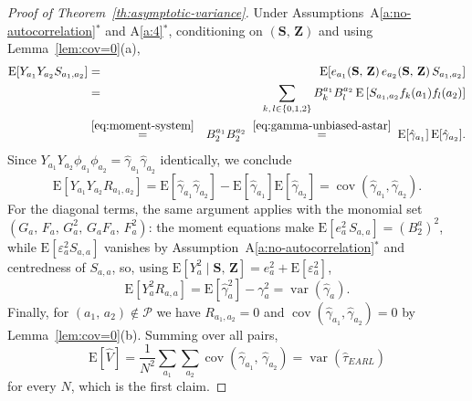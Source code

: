 \documentclass[sigconf]{acmart}
\newcommand{\E}{\mathrm E}
\DeclareMathOperator{\var}{var}
\DeclareMathOperator{\cov}{cov}
\begin{document}
\begin{proof}[Proof of Theorem~\ref{th:asymptotic-variance}]
    Under Assumptions~A\ref{a:no-autocorrelation}$^*$ and A\ref{a:4}$^*$, conditioning on $(\mathbf S,\,\mathbf Z)$ and using Lemma~\ref{lem:cov=0}(a),
    \begin{eqnarray*}
        \E[Y_{a_1}Y_{a_2}S_{a_1,a_2}] &=& \E[e_{a_1}(\mathbf S,\,\mathbf Z)\,e_{a_2}(\mathbf S,\,\mathbf Z)\,S_{a_1,a_2}]\\
        &=& \sum_{k,\,l\in\{0,1,2\}}B^{a_1}_kB^{a_2}_l\,\E\left[S_{a_1,a_2}f_k(a_1)f_l(a_2)\right]\\
        &\stackrel{\eqref{eq:moment-system}}{=}& B_2^{a_1}B_2^{a_2} \;\stackrel{\eqref{eq:gamma-unbiased-astar}}{=}\; \E[\hat\gamma_{a_1}]\,\E[\hat\gamma_{a_2}].
    \end{eqnarray*}
    Since $Y_{a_1}Y_{a_2}\phi_{a_1}\phi_{a_2} = \hat\gamma_{a_1}\hat\gamma_{a_2}$ identically, we conclude
    \begin{equation}\label{eq:pair-unbiased}
        \E[Y_{a_1}Y_{a_2}R_{a_1,a_2}] = \E[\hat\gamma_{a_1}\hat\gamma_{a_2}] - \E[\hat\gamma_{a_1}]\E[\hat\gamma_{a_2}] = \cov(\hat\gamma_{a_1},\hat\gamma_{a_2}).
    \end{equation}
    For the diagonal terms, the same argument applies with the monomial set $(G_a,\,F_a,\,G_a^2,\,G_aF_a,\,F_a^2)$: the moment equations make $\E[e_a^2\,S_{a,a}] = (B_2^a)^2$, while $\E[\varepsilon_a^2 S_{a,a}]$ vanishes by Assumption~A\ref{a:no-autocorrelation}$^*$ and centredness of $S_{a,a}$, so, using $\E[Y_a^2\mid\mathbf S,\,\mathbf Z] = e_a^2 + \E[\varepsilon_a^2]$,
    \begin{equation*}
        \E[Y_a^2R_{a,a}] = \E[\hat\gamma_a^2] - \gamma_a^2 = \var(\hat\gamma_a).
    \end{equation*}
    Finally, for $(a_1,\,a_2)\notin\mathcal P$ we have $R_{a_1,a_2}=0$ and $\cov(\hat\gamma_{a_1},\hat\gamma_{a_2})=0$ by Lemma~\ref{lem:cov=0}(b). Summing over all pairs,
    \begin{equation*}
        \E[\hat V] = \frac 1{N^2}\sum_{a_1}\sum_{a_2}\cov(\hat\gamma_{a_1},\,\hat\gamma_{a_2}) = \var(\hat\tau^{\phantom{1}}_{EARL})
    \end{equation*}
    for every $N$, which is the first claim.


\end{proof}
\end{document}
